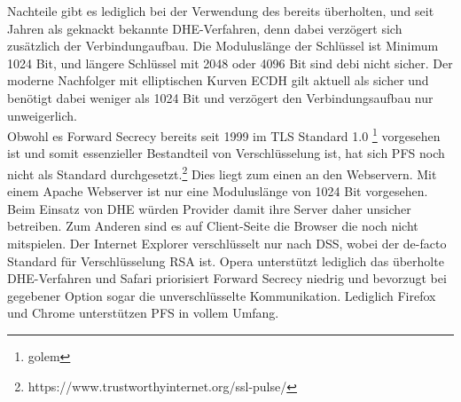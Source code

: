 Nachteile gibt es lediglich bei der Verwendung des bereits überholten, und seit Jahren als geknackt bekannte \ac{DHE}-Verfahren, denn dabei verzögert sich zusätzlich der Verbindungaufbau. Die Moduluslänge der Schlüssel ist Minimum 1024 Bit, und längere Schlüssel mit 2048 oder 4096 Bit sind debi nicht sicher. Der moderne Nachfolger mit elliptischen Kurven \ac{ECDH} gilt aktuell als sicher und benötigt dabei weniger als 1024 Bit und verzögert den Verbindungsaufbau nur unweigerlich.\medskip\\
Obwohl es Forward Secrecy bereits seit 1999 im \ac{TLS} Standard 1.0 \footnote{golem} vorgesehen ist und somit essenzieller Bestandteil von Verschlüsselung ist, hat sich \ac{PFS} noch nicht als Standard durchgesetzt.\footnote{https://www.trustworthyinternet.org/ssl-pulse/} Dies liegt zum einen an den Webservern. Mit einem Apache Webserver ist nur eine Moduluslänge von 1024 Bit vorgesehen. Beim Einsatz von \ac{DHE} würden Provider damit ihre Server daher unsicher betreiben. Zum Anderen sind es auf Client-Seite die Browser die noch nicht mitspielen. Der Internet Explorer verschlüsselt nur nach DSS, wobei der de-facto Standard für Verschlüsselung \ac{RSA} ist. Opera unterstützt lediglich das überholte \ac{DHE}-Verfahren und Safari priorisiert Forward Secrecy niedrig und bevorzugt bei gegebener Option sogar die unverschlüsselte Kommunikation. Lediglich Firefox und Chrome unterstützen \ac{PFS} in vollem Umfang.
